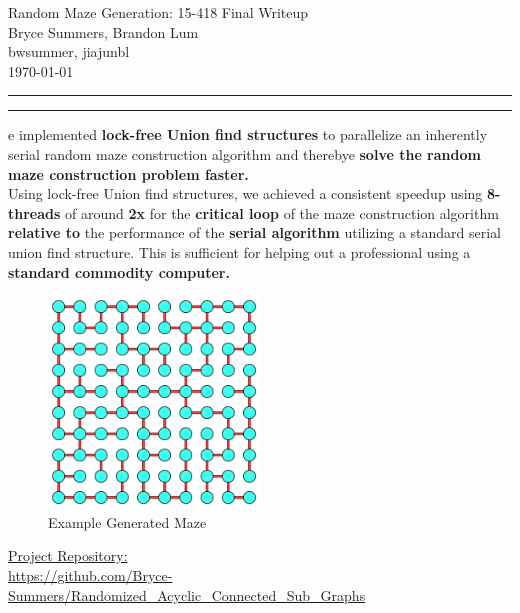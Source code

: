 \documentclass[11pt]{article}
\newcommand{\question}[2] {\vspace{.25in} \hrule\vspace{0.5em}
\noindent{\bf #1: #2} \vspace{0.5em}
\hrule \vspace{.10in}}
\newcommand{\myname}{Bryce Summers, Brandon Lum}
\newcommand{\myandrew}{bwsummer, jiajunbl}
\begin{document}
\medskip                        %

\thispagestyle{plain}
\begin{center}                  %
{\Large Random Maze Generation: 15-418 Final Writeup} \\
\myname \\
\myandrew \\

\today \\
\end{center}


\question{Summary}

We implemented \textbf{lock-free Union find structures} to parallelize an inherently serial random maze construction algorithm and therebye \textbf{solve the random maze construction problem faster.}\\

Using lock-free Union find structures, we achieved a consistent speedup using \textbf{8-threads} of around \textbf{2x} for the \textbf{critical loop} of the maze construction algorithm \textbf{relative to} the performance of the \textbf{serial algorithm} utilizing a standard serial union find structure. This is sufficient for helping out a professional using a \textbf{standard commodity computer.}
\\

\begin{figure}[h]
\centering
\includegraphics[width=0.5\textwidth]{Lattice2}
\caption{Example Generated Maze}
\label{fig:TitlePage}
\end{figure}

\href{https://github.com/Bryce-Summers/Randomized_Acyclic_Connected_Sub_Graphs}{Project Repository:}\\
\url{https://github.com/Bryce-Summers/Randomized_Acyclic_Connected_Sub_Graphs} 
\end{document}
